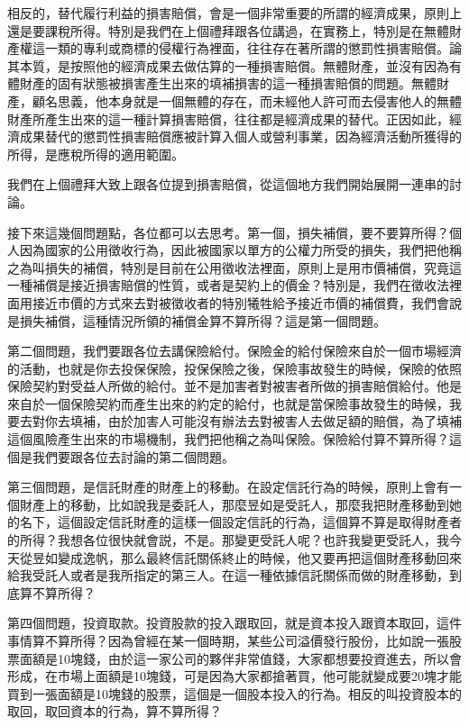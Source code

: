 \documentclass[]{ctexbook}
\begin{document}
相反的，替代履行利益的損害賠償，會是一個非常重要的所謂的經濟成果，原則上還是要課稅所得。特別是我們在上個禮拜跟各位講過，在實務上，特別是在無體財產權這一類的專利或商標的侵權行為裡面，往往存在著所謂的懲罰性損害賠償。論其本質，是按照他的經濟成果去做估算的一種損害賠償。無體財產，並沒有因為有體財產的固有狀態被損害產生出來的填補損害的這一種損害賠償的問題。無體財產，顧名思義，他本身就是一個無體的存在，而未經他人許可而去侵害他人的無體財產所產生出來的這一種計算損害賠償，往往都是經濟成果的替代。正因如此，經濟成果替代的懲罰性損害賠償應被計算入個人或營利事業，因為經濟活動所獲得的所得，是應稅所得的適用範圍。

我們在上個禮拜大致上跟各位提到損害賠償，從這個地方我們開始展開一連串的討論。

接下來這幾個問題點，各位都可以去思考。第一個，損失補償，要不要算所得？個人因為國家的公用徵收行為，因此被國家以單方的公權力所受的損失，我們把他稱之為叫損失的補償，特別是目前在公用徵收法裡面，原則上是用市價補償，究竟這一種補償是接近損害賠償的性質，或者是契約上的價金？特別是，我們在徵收法裡面用接近市價的方式來去對被徵收者的特別犧牲給予接近市價的補償費，我們會說是損失補償，這種情況所領的補償金算不算所得？這是第一個問題。

第二個問題，我們要跟各位去講保險給付。保險金的給付保險來自於一個市場經濟的活動，也就是你去投保保險，投保保險之後，保險事故發生的時候，保險的依照保險契約對受益人所做的給付。並不是加害者對被害者所做的損害賠償給付。他是來自於一個保險契約而產生出來的約定的給付，也就是當保險事故發生的時候，我要去對你去填補，由於加害人可能沒有辦法去對被害人去做足額的賠償，為了填補這個風險產生出來的市場機制，我們把他稱之為叫保險。保險給付算不算所得？這個是我們要跟各位去討論的第二個問題。

第三個問題，是信託財產的財產上的移動。在設定信託行為的時候，原則上會有一個財產上的移動，比如說我是委託人，那麼昱如是受託人，那麼我把財產移動到她的名下，這個設定信託財產的這樣一個設定信託的行為，這個算不算是取得財產者的所得？我想各位很快就會説，不是。那變更受託人呢？也許我變更受託人，我今天從昱如變成逸帆，那么最終信託關係終止的時候，他又要再把這個財產移動回來給我受託人或者是我所指定的第三人。在這一種依據信託關係而做的財產移動，到底算不算所得？

第四個問題，投資取款。投資股款的投入跟取回，就是資本投入跟資本取回，這件事情算不算所得？因為曾經在某一個時期，某些公司溢價發行股份，比如說一張股票面額是10塊錢，由於這一家公司的夥伴非常值錢，大家都想要投資進去，所以會形成，在市場上面額是10塊錢，可是因為大家都搶著買，他可能就變成要20塊才能買到一張面額是10塊錢的股票，這個是一個股本投入的行為。相反的叫投資股本的取回，取回資本的行為，算不算所得？
\end{document}
